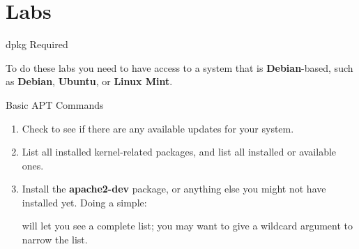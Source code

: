 \clearpage\section{Labs}\begin{Lab}

   \ifINSTRUCTORLED
      \begin{videobox}
         \begin{alltt}
 \end{alltt}
      \end{videobox}
   \fi

   \setcounter{labno}{-1}
   \begin{exe} {dpkg Required}

      \begin{debianfamilybox}
         To do these labs you need to have access to a system that
         is \textbf{Debian}-based, such as \textbf{Debian},
         \textbf{Ubuntu}, or \textbf{Linux Mint}.
      \end{debianfamilybox}
   \end{exe}

   \begin{exe} {Basic APT Commands}


      \begin{enumerate}
         \item
         Check to see if there are any available updates for
         your system.
         \item
         List all installed kernel-related packages, and list
         all installed or available ones.
         \item
         Install the \textbf{apache2-dev} package, or anything
         else you might not have installed yet.  Doing a simple:

         will let you see a complete list; you may want to give a wildcard
         argument to narrow the list.
      \end{enumerate}

      \begin{sol}


\end{sol}
\end{exe}
\end{Lab}
